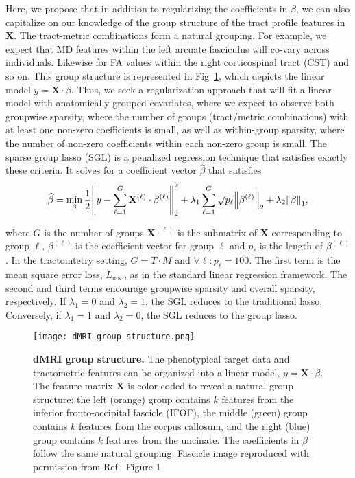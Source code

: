 Here, we propose that in addition to regularizing the coefficients in $\beta$,
we can also capitalize on our knowledge of the group structure of the tract
profile features in $\mathbf{X}$. The tract-metric combinations form a natural
grouping. For example, we expect that MD features within the left arcuate
fasciculus will co-vary across individuals. Likewise for FA values within the
right corticospinal tract (CST) and so on. This group structure is represented
in Fig~\ref{fig:group-structure}, which depicts the linear model $y = \mathbf{X}
\cdot \beta$. Thus, we seek a regularization approach that will fit a linear
model with anatomically-grouped covariates, where we expect to observe both
groupwise sparsity, where the number of groups (tract/metric combinations) with
at least one non-zero coefficients is small, as well as within-group sparsity,
where the number of non-zero coefficients within each non-zero group is small.
The sparse group lasso (SGL)
is a penalized regression technique that satisfies exactly these
criteria\cite{simon2013sparse}. It solves for a coefficient vector
$\widehat{\beta}$ that satisfies
\begin{equation}
    \widehat{\beta} = \min_\beta \frac{1}{2}
    \norm*{y - \displaystyle \sum_{\ell = 1}^{G}
    \mathbf{X}^{(\ell)} \cdot \beta^{(\ell)}}_2^2
    + \lambda_1 \displaystyle \sum_{\ell = 1}^{G}
    \sqrt{p_\ell} \norm*{\beta^{(\ell)}}_2
    + \lambda_2 \norm*{\beta}_1,
    \label{eq:sgl}
\end{equation}

where $G$ is the number of groups $\mathbf{X}^{(\ell)}$ is the submatrix
of $\mathbf{X}$ corresponding to group $\ell$, $\beta^{(\ell)}$ is
the coefficient vector for group $\ell$ and $p_\ell$ is the length of
$\beta^{(\ell)}$. In the tractomtetry setting, $G = T \cdot M$ and
$\forall \ell: p_\ell = 100$. The first term is the mean square error
loss, $L_{\text{mse}}$, as in the standard linear regression framework.
The second and third terms encourage groupwise sparsity and overall
sparsity, respectively. If $\lambda_1 = 0$ and $\lambda_2 = 1$, the
SGL reduces to the traditional lasso\cite{tibshirani1996regression}.
Conversely, if $\lambda_1 = 1$ and $\lambda_2 = 0$, the SGL reduces to
the group lasso\cite{yuan2006model}.

\begin{figure}[!h]
    \centering
    \texttt{[image: dMRI\_group\_structure.png]}
    \caption{{\bf dMRI group structure.}
        The phenotypical target data and tractometric features can be organized
    into a linear model, $y = \mathbf{X} \cdot \beta$. The feature matrix
    $\mathbf{X}$ is color-coded to reveal a natural group structure: the left
    (orange) group contains $k$ features from the inferior fronto-occipital
    fascicle (IFOF), the middle (green) group contains $k$ features from the
    corpus callosum, and the right (blue) group contains $k$ features from the
    uncinate. The coefficients in $\beta$ follow the same natural grouping.
    Fascicle image reproduced with permission from Ref~\cite{yeatman2012tract}
    Figure 1.}
    \label{fig:group-structure}
\end{figure}


